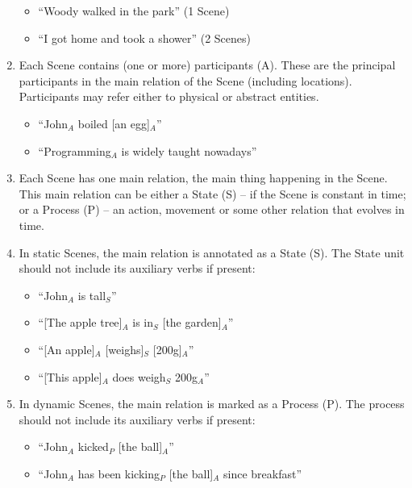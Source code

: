 \documentclass[11pt]{article}
\begin{document}
\begin{enumerate}
\begin{itemize}
\item
``Woody walked in the park'' (1 Scene)
\item
``I got home and took a shower'' (2 Scenes)
\end{itemize}

\item
Each Scene contains (one or more) participants (A). These are the principal participants in the main relation of the Scene (including locations). Participants may refer either to physical or abstract entities.

\begin{itemize}
\item
``John$_A$ boiled [an egg]$_A$''
\item
``Programming$_A$ is widely taught nowadays''
\end{itemize}

\item
Each Scene has one main relation, the main thing happening in the Scene. This main relation can be either a State (S) – if the Scene is constant in time; or a Process (P) – an action, movement or some other relation that evolves in time.

\item
  In static Scenes, the main relation is annotated as a State (S). The State unit should not include its auxiliary
  verbs if present:

\begin{itemize}
\item
``John$_A$ is tall$_S$''
\item
``[The apple tree]$_A$ is in$_S$ [the garden]$_A$''
\item
``[An apple]$_A$ [weighs]$_S$ [200g]$_A$''
\item
``[This apple]$_A$ does weigh$_S$ 200g$_A$''
\end{itemize}

\item
In dynamic Scenes, the main relation is marked as a Process (P). The process should not include its auxiliary verbs if present:

\begin{itemize}
\item
``John$_A$ kicked$_P$ [the ball]$_A$''
\item
``John$_A$ has been kicking$_P$ [the ball]$_A$ since breakfast''
\end{itemize}


\end{enumerate}
\end{document}
